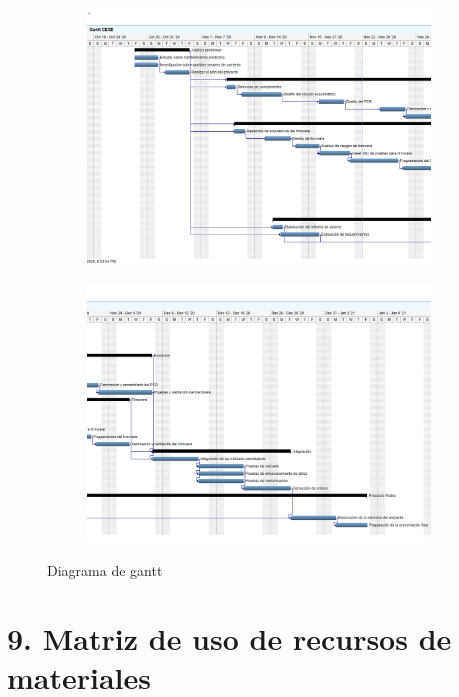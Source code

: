 \documentclass[11pt]{charter}
\begin{document}
\begin{figure}[htpb]
\begin{subfigure}[b]{1\textwidth}
\centering 
\includegraphics[width=.93\textwidth]{./Figuras/gant.png}
\end{subfigure}
\begin{subfigure}[b]{1\textwidth}
\centering 
\includegraphics[width=.93\textwidth]{./Figuras/gant2.png}
\end{subfigure}
\caption{Diagrama de gantt}
\label{fig:gantt}
\end{figure}

\section{9. Matriz de uso de recursos de materiales}
\label{sec:recursos}
\end{document}
